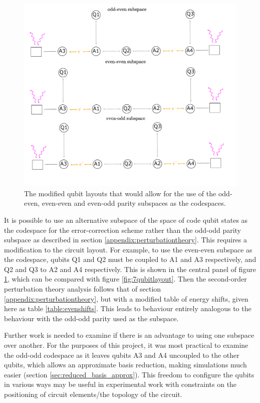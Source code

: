 \documentclass{report}
\begin{document}
\begin{appendices}
\begin{figure}[ht]
    \centering
    \includegraphics[scale = 0.9]{Figures/different_codespaces.pdf}
    \caption{The modified qubit layouts that would allow for the use of the odd-even, even-even and even-odd parity subspaces as the codespaces.}
    \label{fig:differentcodespaces}
\end{figure}
It is possible to use an alternative subspace of the space of code qubit states as the codespace for the error-correction scheme rather than the odd-odd parity subspace as described in section \ref{appendix:perturbationtheory}. This requires a modification to the circuit layout. For example, to use the even-even subspace as the codespace, qubits Q1 and Q2 must be coupled to A1 and A3 respectively, and Q2 and Q3 to A2 and A4 respectively. This is shown in the central panel of figure \ref{fig:differentcodespaces}, which can be compared with figure \ref{fig:7qubitlayout}. Then the second-order perturbation theory analysis follows that of section \ref{appendix:perturbationtheory}, but with a modified table of energy shifts, given here as table \ref{table:evenshifts}. This leads to behaviour entirely analogous to the behaviour with the odd-odd parity used as the subspace.

Further work is needed to examine if there is an advantage to using one subspace over another. For the purposes of this project, it was most practical to examine the odd-odd codespace as it leaves qubits A3 and A4 uncoupled to the other qubits, which allows an approximate basis reduction, making simulations much easier (section \ref{sec:reduced_basis_approx}). This freedom to configure the qubits in various ways may be useful in experimental work with constraints on the positioning of circuit elements/the topology of the circuit.


\end{appendices}
\end{document}
